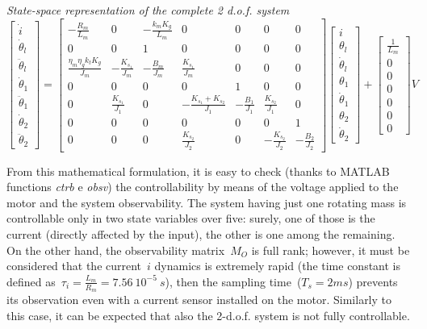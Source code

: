 \textit{State-space representation of the complete 2 d.o.f. system}
\begin{equation}
	\begin{bmatrix}
		\dot{i} \\
		\dot{\theta}_l \\
		\ddot{\theta}_l \\
		\dot{\theta}_1 \\
		\ddot{\theta}_1 \\
		\dot{\theta}_2 \\
		\ddot{\theta}_2
	\end{bmatrix}
	=
	\begin{bmatrix}
		-\frac{R_m}{L_m} & 0 & -\frac{k_m K_g}{L_m} & 0 & 0 & 0 & 0 \\
		0 & 0 &1 & 0 & 0 & 0 & 0 \\
		\frac{\eta_m \eta_g k_t K_g}{J_m} & -\frac{K_{s_1}}{J_m} & -\frac{B_m}{J_m} & \frac{K_{s_1}}{J_m} & 0 & 0 & 0 \\
		0 & 0 & 0 & 0 & 1 & 0 & 0 \\
		0 & \frac{K_{s_1}}{J_1} & 0 & -\frac{K_{s_1}+K_{s_2}}{J_1} & -\frac{B_1}{J_1} & \frac{K_{s_2}}{J_1} & 0 \\
		0 & 0 & 0 & 0 & 0 & 0 & 1 \\
		0 & 0 & 0 & \frac{K_{s_2}}{J_2} & 0 & -\frac{K_{s_2}}{J_2} & -\frac{B_2}{J_2}
	\end{bmatrix}
	\begin{bmatrix}
		i \\
		\theta_l \\
		\dot{\theta}_l \\
		\theta_1 \\
		\dot{\theta}_1 \\
		\theta_2 \\
		\dot{\theta}_2
	\end{bmatrix}
	+
	\begin{bmatrix}
		\frac{1}{L_m} \\
		0 \\
		0 \\
		0 \\
		0 \\
		0 \\
		0
	\end{bmatrix}
	V
\end{equation}

From this mathematical formulation, it is easy to check (thanks to MATLAB functions  \textit{ctrb} e \textit{obsv}) the controllability by means of the voltage applied to the motor and the system observability.
The system having just one rotating mass is controllable only in two state variables over five: surely, one of those is the current (directly affected by the input), the other is one among the remaining. On the other hand, the observability matrix~$M_O$ is full rank; however, it must be considered that the current~$i$ dynamics is extremely rapid (the time constant is defined as~$\tau_i = \frac{L_m}{R_m} = 7.56\ 10^{-5} \ s$), then the sampling time~($T_s = 2 ms$) prevents its observation even with a current sensor installed on the motor.
Similarly to this case, it can be expected that also the 2-d.o.f. system is not fully controllable. \\

